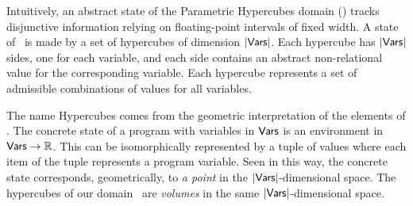 Intuitively, an abstract state of the Parametric Hypercubes domain (\adomain) tracks disjunctive information relying on floating-point intervals of fixed width. A state of \adomain\ is made by a set of hypercubes of dimension $|\mathsf{Vars}|$. Each hypercube has $|\mathsf{Vars}|$ sides, one for each variable, and each side contains an abstract non-relational value for the corresponding variable. Each hypercube represents a set of admissible combinations of values for all variables. 

The name Hypercubes comes from the geometric interpretation of the elements of \adomain . The concrete state of a program with variables in $\mathsf{Vars}$ is an environment in $\mathsf{Vars} \rightarrow\mathbb{R}$. This can be isomorphically represented by a tuple of values where each item of the tuple represents a program variable. Seen in this way, the concrete state corresponds, geometrically, to \emph{a point} in the $|\mathsf{Vars}|$-dimensional space. 
The hypercubes of our domain \adomain\ are \emph{volumes} in the same $|\mathsf{Vars}|$-dimensional space. 

\vspace{-10pt}
